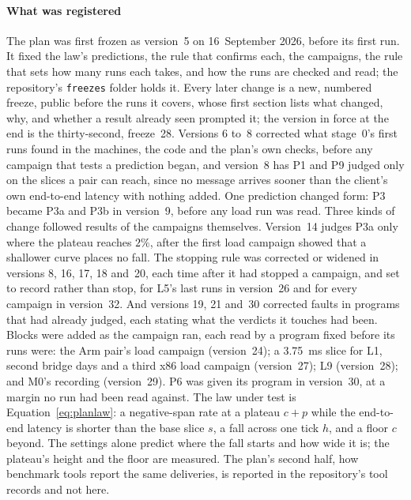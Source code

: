 \documentclass[10pt,journal,onecolumn]{IEEEtran}
\begin{document}
\paragraph{What was registered} The plan was first frozen as version~5 on 16~September 2026,
before its first run. It fixed the law's predictions, the rule that confirms each, the campaigns,
the rule that sets how many runs each takes, and how the runs are checked and read; the
repository's \texttt{freezes} folder holds it. Every later change is a new, numbered freeze, public
before the runs it covers, whose first section lists what changed, why, and whether a result
already seen prompted it; the version in force at the end is the thirty-second, freeze~28.
Versions 6 to~8 corrected what stage~0's first runs found in the machines, the code and the plan's
own checks, before any campaign that tests a prediction began, and version~8 has P1 and P9 judged only on the slices a pair can reach,
since no message arrives sooner than the client's own end-to-end latency with nothing added. One prediction
changed form: P3 became P3a and P3b in version~9, before any load run was read. Three kinds of
change followed results of the campaigns themselves. Version~14 judges P3a only where the plateau
reaches $2\%$, after the first load campaign showed that a shallower curve places no fall. The
stopping rule was corrected or widened in versions 8, 16, 17, 18 and~20, each time after it had
stopped a campaign, and set to record rather than stop, for L5's last runs in version~26 and for
every campaign in version~32. And versions 19, 21 and~30 corrected faults in programs that had
already judged, each stating what the verdicts it touches had been. Blocks were added as the
campaign ran, each read by a program fixed before its runs were: the Arm pair's load campaign
(version~24); a 3.75~ms slice for L1, second bridge days and a third x86 load campaign
(version~27); L9 (version~28); and M0's recording (version~29). P6 was given its program in
version~30, at a margin no run had been read against. The law under test is
Equation~\ref{eq:planlaw}: a negative-span rate at a plateau $c + p$ while the end-to-end latency is
shorter than the base slice $s$, a fall across one tick $h$, and a floor $c$ beyond. The settings alone
predict where the fall starts and how wide it is; the plateau's height and the floor are measured.
The plan's second half, how benchmark tools report the same deliveries, is reported in the
repository's tool records and not here.
\end{document}
